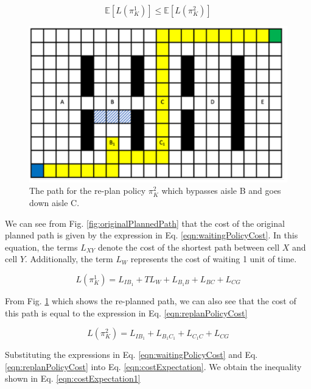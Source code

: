 \documentclass[a4paper,12pt]{article}
\begin{document}
			\begin{equation}
				\mathbb{E}\left[L\left(\pi_{K}^{1}\right)\right] \leq \mathbb{E}\left[L\left(\pi_{K}^{2}\right)\right]
				\label{eqn:costExpectation}
			\end{equation}

			\begin{figure}[H]
				\centering
				\includegraphics[scale=0.6]{images/replannedPathAisleB.png}
				\caption{The path for the re-plan policy $\pi_{K}^{2}$ which bypasses aisle B and goes down aisle C.}
				\label{fig:replannedPathAisleB}
			\end{figure}

			We can see from Fig. \ref{fig:originalPlannedPath} that the cost of the original planned path is given by the expression in Eq. \ref{eqn:waitingPolicyCost}. In this equation, the terms $L_{XY}$ denote the cost of the shortest path between cell $X$ and cell $Y$. Additionally, the term $L_{W}$ represents the cost of waiting 1 unit of time.
			
			\begin{equation}
				L\left(\pi_{K}^{1}\right) = L_{IB_{1}} + TL_W + L_{B_{1}B} + L_{BC} + L_{CG}
				\label{eqn:waitingPolicyCost}
			\end{equation}

			From Fig. \ref{fig:replannedPathAisleB} which shows the re-planned path, we can also see that the cost of this path is equal to the expression in Eq. \ref{eqn:replanPolicyCost}

			\begin{equation}
				L\left(\pi_{K}^{2}\right) = L_{IB_{1}} + L_{B_{1}C_{1}} + L_{C_{1}C} + L_{CG}
				\label{eqn:replanPolicyCost}
			\end{equation}

			Substituting the expressions in Eq. \ref{eqn:waitingPolicyCost} and Eq. \ref{eqn:replanPolicyCost} into Eq. \ref{eqn:costExpectation}. We obtain the inequality shown in Eq. \ref{eqn:costExpectation1}
\end{document}
